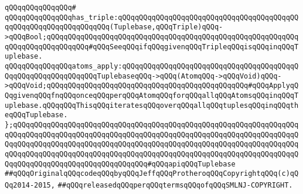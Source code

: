 \verb|qQQqqQQqqQQqqQQq#|\newline
\verb|qQQqqQQqqQQqqQQqhas_triple:qQQqqQQqqQQqqQQqqQQqqQQqqQQqqQQqqQQqqQQqqQQqqQQqqQQqqQQqqQQqqQQqqQQq(Tuplebase,qQQqTriple)qQQq->qQQqBool;qQQqqQQqqQQqqQQqqQQqqQQqqQQqqQQqqQQqqQQqqQQqqQQqqQQqqQQqqQQqqQQqqQQqqQQqqQQqqQQq#qQQqSeeqQQqifqQQqgivenqQQqTripleqQQqisqQQqinqQQqTuplebase.|\newline
\newline
\verb|qQQqqQQqqQQqqQQqatoms_apply:qQQqqQQqqQQqqQQqqQQqqQQqqQQqqQQqqQQqqQQqqQQqqQQqqQQqqQQqqQQqqQQqTuplebaseqQQq->qQQq(AtomqQQq->qQQqVoid)qQQq->qQQqVoid;qQQqqQQqqQQqqQQqqQQqqQQqqQQqqQQqqQQqqQQqqQQqqQQq#qQQqApplyqQQqgivenqQQqfnqQQqonceqQQqperqQQqAtomqQQqforqQQqallqQQqAtomsqQQqinqQQqTuplebase.qQQqqQQqThisqQQqiteratesqQQqoverqQQqallqQQqtuplesqQQqinqQQqtheqQQqTuplebase.|\newline
\newline
\verb|};qQQqqQQqqQQqqQQqqQQqqQQqqQQqqQQqqQQqqQQqqQQqqQQqqQQqqQQqqQQqqQQqqQQqqQQqqQQqqQQqqQQqqQQqqQQqqQQqqQQqqQQqqQQqqQQqqQQqqQQqqQQqqQQqqQQqqQQqqQQqqQQqqQQqqQQqqQQqqQQqqQQqqQQqqQQqqQQqqQQqqQQqqQQqqQQqqQQqqQQqqQQqqQQqqQQqqQQqqQQqqQQqqQQqqQQqqQQqqQQqqQQqqQQqqQQqqQQqqQQqqQQqqQQqqQQqqQQqqQQqqQQqqQQqqQQqqQQqqQQqqQQqqQQqqQQq#qQQqapiqQQqTuplebase|\newline
\newline
\newline
\verb|##qQQqOriginalqQQqcodeqQQqbyqQQqJeffqQQqProtheroqQQqCopyrightqQQq(c)qQQq2014-2015,|\newline
\verb|##qQQqreleasedqQQqperqQQqtermsqQQqofqQQqSMLNJ-COPYRIGHT.|\newline


